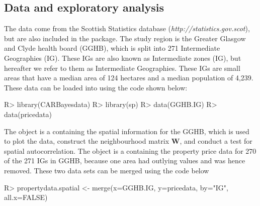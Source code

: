 \documentclass[article,shortnames,nojss]{jss}
\begin{document}
\subsection{Data and exploratory analysis}
The data come from the Scottish Statistics database (\emph{http://statistics.gov.scot}), but are also included in the   package. The study region is the Greater Glasgow and Clyde health board (GGHB), which is split into 271 Intermediate Geographies (IG). These IGs are also known as Intermediate zones (IG), but hereafter we refer to them as Intermediate Geographies. These IGs are small areas that have a median area of 124 hectares and a median population of 4,239. These data can be loaded into  using the code shown below:
    
    
\begin{Schunk}
\begin{Sinput}
R> library(CARBayesdata)
R> library(sp)
R> data(GGHB.IG)
R> data(pricedata)
\end{Sinput}
\end{Schunk}
    
The  object is a  containing the spatial information for the GGHB, which is used to plot the data, construct the neighbourhood matrix $\mathbf{W}$, and conduct a test for spatial autocorrelation. The  object is a   containing the property price data for 270 of the 271 IGs in GGHB, because one area had outlying values and was hence removed. These two data sets can be merged using the code below
    
\begin{Schunk}
\begin{Sinput}
R> propertydata.spatial <- merge(x=GGHB.IG, y=pricedata, by="IG", all.x=FALSE)
\end{Sinput}
\end{Schunk}
    
\end{document}
